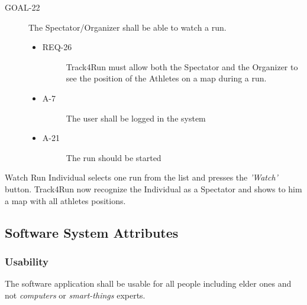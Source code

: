 \documentclass[a4paper]{article}
\newcommand{\requirement}{\ding{229}}%
\begin{document}
        \begin{description}
        	\item[GOAL-22] The Spectator/Organizer shall be able to watch a run.
            	\begin{itemize}
            	    \item[\requirement]
                	\begin{description}
                	\item[REQ-26] Track4Run must allow both the Spectator and the Organizer to see the position of the Athletes on a map during a run.
                	\end{description}
                	\item
                	\begin{description}
                	\item[A-7] The user shall be logged in the system         \end{description}
                	\item
                	\begin{description}
                	\item[A-21] The run should be started  
                	\end{description}
                	\end{itemize}
        \end{description}

        \begin{usecase}{Watch Run}
              {Individual selects one run from the list and presses the \textit{'Watch'} button.}
              {Track4Run now recognize the Individual as a Spectator and shows to him a map with all athletes positions.}
        \end{usecase}
        
        
        \subsection{Software System Attributes}
        \subsubsection{Usability}
        The software application shall be usable for all people including elder ones and not \textit{computers} or \textit{smart-things} experts.
        
\end{document}
